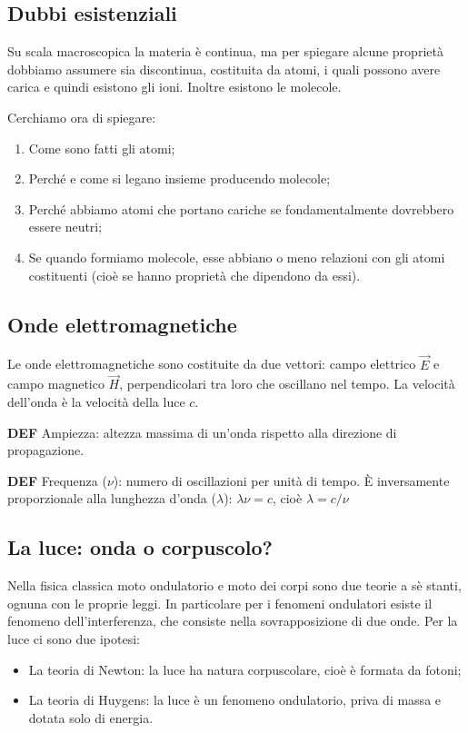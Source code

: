 \subsection{Dubbi esistenziali}
Su scala macroscopica la materia è continua, ma per spiegare alcune proprietà dobbiamo assumere sia discontinua, costituita da atomi, i quali possono avere carica e quindi esistono gli ioni. Inoltre esistono le molecole.

Cerchiamo ora di spiegare:
\begin{enumerate}
    \item Come sono fatti gli atomi;
    \item Perché e come si legano insieme producendo molecole;
    \item Perché abbiamo atomi che portano cariche se fondamentalmente dovrebbero essere neutri;
    \item Se quando formiamo molecole, esse abbiano o meno relazioni con gli atomi costituenti (cioè se hanno proprietà che dipendono da essi).
  \end{enumerate}
  
  \subsection{Onde elettromagnetiche}
Le onde elettromagnetiche sono costituite da due vettori: campo elettrico $\vec{E}$ e campo magnetico $\vec{H}$, perpendicolari tra loro che oscillano nel tempo. La velocità dell'onda è la velocità della luce $c$.

\vspace{0.2cm}\textbf{DEF} Ampiezza: altezza massima di un'onda rispetto alla direzione di propagazione. 

\vspace{0.2cm}\textbf{DEF} Frequenza ($\nu$): numero di oscillazioni per unità di tempo. È inversamente proporzionale alla lunghezza d'onda ($\lambda$): $\lambda\nu=c$, cioè $\lambda=c/\nu$

\subsection{La luce: onda o corpuscolo?}
Nella fisica classica moto ondulatorio e moto dei corpi sono due teorie a sè stanti, ognuna con le proprie leggi.
In particolare per i fenomeni ondulatori esiste il fenomeno dell'interferenza, che consiste nella sovrapposizione di due onde.
Per la luce ci sono due ipotesi:
\begin{itemize}
  \item  La teoria di Newton: la luce ha natura corpuscolare, cioè è formata da fotoni;
  \item  La teoria di Huygens: la luce è un fenomeno ondulatorio, priva di massa e dotata solo di energia.
\end{itemize}
